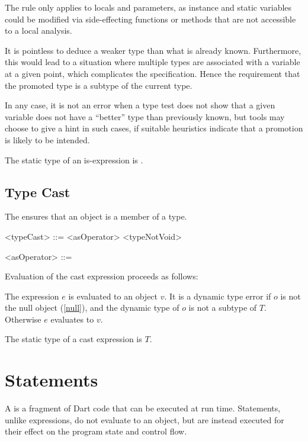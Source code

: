 \documentclass[makeidx]{article}
\begin{document}
{{The rule only applies to locals and parameters, as instance and static variables could be modified via side-effecting functions or methods that are not accessible to a local analysis.

It is pointless to deduce a weaker type than what is already known.
Furthermore, this would lead to a situation where multiple types are associated with a variable at a given point, which complicates the specification.
Hence the requirement that the promoted type is a subtype of the current type.

In any case, it is not an error when a type test does not show
that a given variable does not have a ``better'' type than previously known,
but tools may choose to give a hint in such cases,
if suitable heuristics indicate that a promotion is likely to be intended.
}

\LMHash{}%
The static type of an is-expression is .


\subsection{Type Cast}

\LMHash{}%
The  ensures that an object is a member of a type.

\begin{grammar}
<typeCast> ::= <asOperator> <typeNotVoid>

<asOperator> ::= \AS{}
\end{grammar}

\LMHash{}%
 Evaluation of the cast expression  proceeds as follows:

\LMHash{}%
The expression $e$ is evaluated to an object $v$.
It is a dynamic type error if $o$ is not the null object (\ref{null}),
and the dynamic type of $o$ is not a subtype of $T$.
Otherwise $e$ evaluates to $v$.

\LMHash{}%
The static type of a cast expression  is $T$.


\section{Statements}

\LMHash{}%
A  is a fragment of Dart code that can be executed at run time.
Statements, unlike expressions, do not evaluate to an object,
but are instead executed for their effect on the program state and control flow.

}
\end{document}

